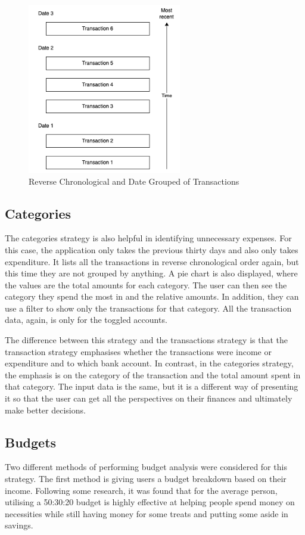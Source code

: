 \begin{figure}[H]
	\centering
	\includegraphics[width=0.6\textwidth]{images/transaction_labels.png}
	\caption{Reverse Chronological and Date Grouped of Transactions}
	\label{fig:TransactionLabels}
\end{figure}

\subsection{Categories}
The categories strategy is also helpful in identifying unnecessary expenses. For this case, the application only takes the previous thirty days and also only takes expenditure. It lists all the transactions in reverse chronological order again, but this time they are not grouped by anything. A pie chart is also displayed, where the values are the total amounts for each category. The user can then see the category they spend the most in and the relative amounts. In addition, they can use a filter to show only the transactions for that category. All the transaction data, again, is only for the toggled accounts. 

The difference between this strategy and the transactions strategy is that the transaction strategy emphasises whether the transactions were income or expenditure and to which bank account. In contrast, in the categories strategy, the emphasis is on the category of the transaction and the total amount spent in that category. The input data is the same, but it is a different way of presenting it so that the user can get all the perspectives on their finances and ultimately make better decisions.

\subsection{Budgets}
Two different methods of performing budget analysis were considered for this strategy. The first method is giving users a budget breakdown based on their income. Following some research, it was found that for the average person, utilising a 50:30:20 budget is highly effective at helping people spend money on necessities while still having money for some treats and putting some aside in savings.

